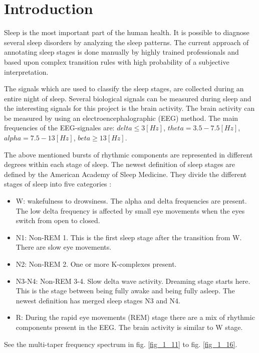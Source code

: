 \section{Introduction}
\label{sec:intro}

Sleep is the most important part of the human health. It is possible to diagnose several sleep disorders by analyzing the sleep patterns.
The current approach of annotating sleep stages is done manually by highly trained professionals and based upon complex transition rules with high probability of a subjective interpretation.

The signals which are used to classify the sleep stages, are collected during an entire night of sleep. Several biological signals can be measured during sleep and the interesting signals for this project is the brain activity. The brain activity can be measured by using an electroencephalographic (EEG) method. 
The main frequencies of the EEG-signales are: $delta \le 3 \left[ Hz \right]$, 
$theta= 3.5-7.5 \left[ Hz \right]$,
$alpha= 7.5-13 \left[ Hz \right]$, 
$beta \ge 13 \left[ Hz \right]$.

The above mentioned bursts of rhythmic components are represented in different degrees within each stage of sleep.   
The newest definition of sleep stages are defined by the American Academy of Sleep Medicine. They divide the different stages of sleep into five categories \cite{main_ar, AASM}: 
\begin{itemize}
\item W: wakefulness to drowsiness. The alpha and delta frequencies are present. The low delta frequency is affected by small eye movements when the eyes switch from open to closed. %
\item N1: Non-REM 1. This is the first sleep stage after the transition from W. There are slow eye movements. %
\item N2: Non-REM 2. One or more K-complexes present. %
\item N3-N4: Non-REM 3-4. Slow delta wave activity. Dreaming stage starts here. This is the stage between being fully awake and being fully asleep. The newest definition has merged sleep stages N3 and N4. %
\item R: During the rapid eye movements (REM) stage there are a mix of rhythmic components present in the EEG. The brain activity is similar to W stage. %
\end{itemize} 
See the multi-taper frequency spectrum in fig. \ref{fig_1_11} to fig. \ref{fig_1_16}.

